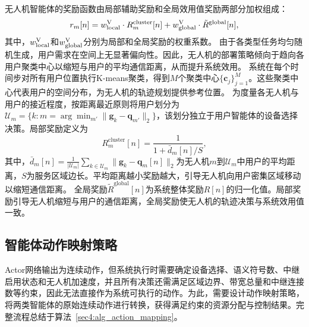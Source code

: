 无人机智能体的奖励函数由局部辅助奖励和全局效用值奖励两部分加权组成：
\begin{equation}
r_m[n] = w_{\text{local}}^{\rm V} \cdot R_m^{\text{cluster}}[n] + w_{\text{global}}^{\rm V} \cdot \tilde{R}^{\text{global}}[n],
\end{equation}
其中，$w_{\text{local}}^{\rm V}$和$w_{\text{global}}^{\rm V}$分别为局部和全局奖励的权重系数。
由于各类型任务均匀随机生成，用户需求在空间上无显著偏向性。因此，无人机的部署策略倾向于趋向各用户聚类中心以缩短与用户的平均通信距离，从而提升系统效用。
系统在每个时间步对所有用户位置执行K-means聚类，得到$M$个聚类中心$\{\mathbf{c}_j\}_{j=1}^M$。这些聚类中心代表用户的空间分布，为无人机的轨迹规划提供参考位置。
为度量各无人机与用户的接近程度，按距离最近原则将用户划分为$\mathcal{U}_m = \{k : m = \arg\min_{m'} \|\mathbf{g}_k - \mathbf{q}_{m'}\|_2\}$，该划分独立于用户智能体的设备选择决策。局部奖励定义为
\begin{equation}
R_m^{\text{cluster}}[n] = \frac{1}{1 + \bar{d}_m[n] / S},
\end{equation}
其中，$\bar{d}_m[n] = \frac{1}{|\mathcal{U}_m|}\sum_{k\in\mathcal{U}_m}\|\mathbf{g}_k - \mathbf{q}_m[n]\|_2$为无人机$m$到$\mathcal{U}_m$中用户的平均距离，$S$为服务区域边长。平均距离越小奖励越大，引导无人机向用户密集区域移动以缩短通信距离。
全局奖励$\tilde{R}^{\text{global}}[n]$为系统整体奖励$R[n]$的归一化值。局部奖励引导无人机缩短与用户的通信距离，全局奖励使无人机的轨迹决策与系统效用值一致。

\subsection{智能体动作映射策略}
Actor网络输出为连续动作，但系统执行时需要确定设备选择、语义符号数、中继启用状态和无人机加速度，并且所有决策还需满足区域边界、带宽总量和中继连接数等约束，因此无法直接作为系统可执行的动作。为此，需要设计动作映射策略，将两类智能体的原始连续动作进行转换，获得满足约束的资源分配与控制结果。完整流程总结于算法~\ref{sec4:alg_action_mapping}。

